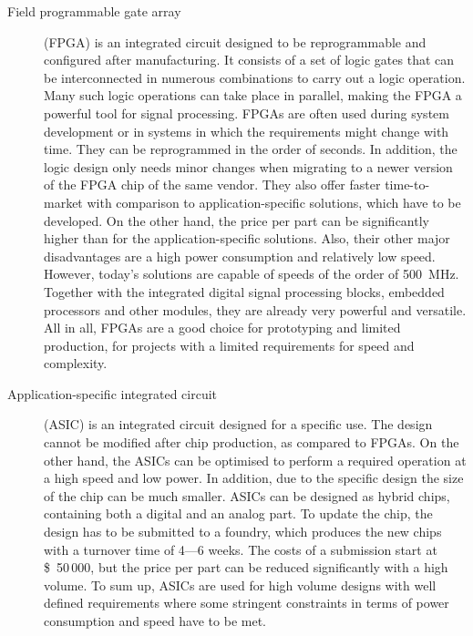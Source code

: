 \documentclass[12pt]{mytustyle}  %
\begin{document}
\begin{description}
\item[Field programmable gate array] (FPGA) is an integrated circuit designed to be reprogrammable and configured after manufacturing. It consists of a set of logic gates that can be interconnected in numerous combinations to carry out a logic operation. Many such logic operations can take place in parallel, making the FPGA a powerful tool for signal processing. FPGAs are often used during system development or in systems in which the requirements might change with time. They can be reprogrammed in the order of seconds. In addition, the logic design only needs minor changes when migrating to a newer version of the FPGA chip of the same vendor. They also offer faster time-to-market with comparison to application-specific solutions, which have to be developed. On the other hand, the price per part can be significantly higher than for the application-specific solutions. Also, their other major disadvantages are a high power consumption and relatively low speed. However, today's solutions are capable of speeds of the order of 500~MHz. Together with the integrated digital signal processing blocks, embedded processors and other modules, they are already very powerful and versatile. All in all, FPGAs are a good choice for prototyping and limited production, for projects with a limited requirements for speed and complexity.

\item[Application-specific integrated circuit] (ASIC) is an integrated circuit designed for a specific use. The design cannot be modified after chip production, as compared to FPGAs. On the other hand, the ASICs can be optimised to perform a required operation at a high speed and low power. In addition, due to the specific design the size of the chip can be much smaller. ASICs can be designed as hybrid chips, containing both a digital and an analog part.  
To update the chip, the design has to be submitted to a foundry, which produces the new chips with a turnover time of 4---6 weeks. The costs of a submission start at \$~50\,000, but the price per part can be reduced significantly with a high volume. To sum up, ASICs are used for high volume designs with well defined requirements where some stringent constraints in terms of power consumption and speed have to be met.
\end{description} 
\end{document}
